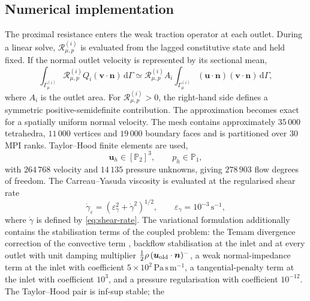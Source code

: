 \documentclass[lineno]{jfm}
\begin{document}
\subsection{Numerical implementation}
\label{sec:numerical-discretisation}
The proximal resistance enters the weak traction operator at each outlet.
During a linear solve,
$\mathcal{R}_{\mu,p}^{(i)}$ is evaluated from the lagged constitutive state and
held fixed. If the normal outlet velocity is represented by its sectional mean,
\begin{equation}
\int_{\Gamma_\mu^{(i)}}
\mathcal{R}_{\mu,p}^{(i)}Q_i
(\boldsymbol{v}\cdot\boldsymbol{n})\,\mathrm{d}\Gamma
\simeq
\mathcal{R}_{\mu,p}^{(i)}A_i
\int_{\Gamma_\mu^{(i)}}
(\boldsymbol{u}\cdot\boldsymbol{n})
(\boldsymbol{v}\cdot\boldsymbol{n})\,\mathrm{d}\Gamma ,
\label{eq:coronary-implicit-resistance}
\end{equation}
where $A_i$ is the outlet area. For
$\mathcal{R}_{\mu,p}^{(i)}>0$, the right-hand side defines a symmetric
positive-semidefinite contribution. The approximation becomes exact for a
spatially uniform normal velocity.
The mesh contains approximately $35\,000$ tetrahedra, $11\,000$ vertices and
$19\,000$ boundary faces and is partitioned over 30 MPI ranks. Taylor--Hood
finite elements \citep{TaylorHood1973} are used,
\begin{equation}
\boldsymbol{u}_h\in[\mathbb{P}_2]^3,
\qquad
p_h\in\mathbb{P}_1,
\end{equation}
with $264\,768$ velocity and $14\,135$ pressure unknowns, giving
$278\,903$ flow degrees of freedom.
The Carreau--Yasuda viscosity is evaluated at the regularised shear rate
\begin{equation}
\dot{\gamma}_{\varepsilon}
=
\left(
\varepsilon_{\gamma}^{2}
+\dot{\gamma}^{2}
\right)^{1/2},
\qquad
\varepsilon_{\gamma}=10^{-3}\,\mathrm{s^{-1}},
\label{eq:regularised-shear-rate}
\end{equation}
where $\dot\gamma$ is defined by \eqref{eq:shear-rate}. The variational
formulation additionally contains the stabilisation terms of the coupled
problem: the Temam divergence correction of the convective term
\citep{Temam2001}, backflow stabilisation at the inlet and at every outlet
\citep{EsmailyMoghadam2011} with unit damping multiplier
$\tfrac12\rho\,(\boldsymbol{u}_{\rm old}\cdot\boldsymbol{n})^{-}$, a weak
normal-impedance term at the inlet with coefficient
$5\times10^{2}\,\mathrm{Pa\,s\,m^{-1}}$, a tangential-penalty term at the
inlet with coefficient $10^{3}$, and a pressure regularisation with
coefficient $10^{-12}$. The Taylor--Hood pair is inf-sup stable; the
\end{document}
